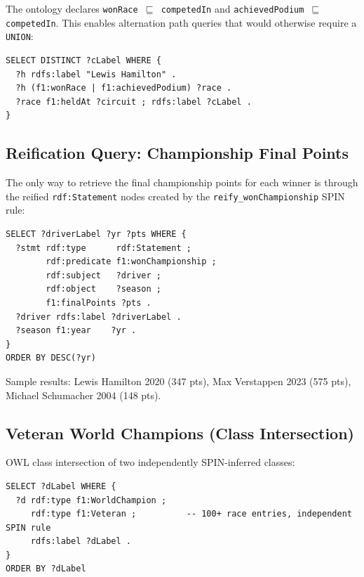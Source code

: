 \documentclass[12pt,a4paper]{article}
\begin{document}
The ontology declares \texttt{wonRace $\sqsubseteq$ competedIn} and
\texttt{achievedPodium $\sqsubseteq$ competedIn}. This enables alternation
path queries that would otherwise require a \texttt{UNION}:

\begin{lstlisting}[style=sparql, caption={Circuits where Hamilton won or achieved a podium}]
SELECT DISTINCT ?cLabel WHERE {
  ?h rdfs:label "Lewis Hamilton" .
  ?h (f1:wonRace | f1:achievedPodium) ?race .
  ?race f1:heldAt ?circuit ; rdfs:label ?cLabel .
}
\end{lstlisting}

\subsection{Reification Query: Championship Final Points}

The only way to retrieve the final championship points for each winner is through
the reified \texttt{rdf:Statement} nodes created by the \texttt{reify\_wonChampionship}
SPIN rule:

\begin{lstlisting}[style=sparql, caption={Championship points retrieved from rdf:Statement reification nodes}]
SELECT ?driverLabel ?yr ?pts WHERE {
  ?stmt rdf:type      rdf:Statement ;
        rdf:predicate f1:wonChampionship ;
        rdf:subject   ?driver ;
        rdf:object    ?season ;
        f1:finalPoints ?pts .
  ?driver rdfs:label ?driverLabel .
  ?season f1:year    ?yr .
}
ORDER BY DESC(?yr)
\end{lstlisting}

Sample results: Lewis Hamilton 2020 (347 pts), Max Verstappen 2023 (575 pts),
Michael Schumacher 2004 (148 pts).

\subsection{Veteran World Champions (Class Intersection)}

OWL class intersection of two independently SPIN-inferred classes:

\begin{lstlisting}[style=sparql, caption={Drivers classified as both WorldChampion and Veteran}]
SELECT ?dLabel WHERE {
  ?d rdf:type f1:WorldChampion ;
     rdf:type f1:Veteran ;          -- 100+ race entries, independent SPIN rule
     rdfs:label ?dLabel .
}
ORDER BY ?dLabel
\end{lstlisting}
\end{document}

